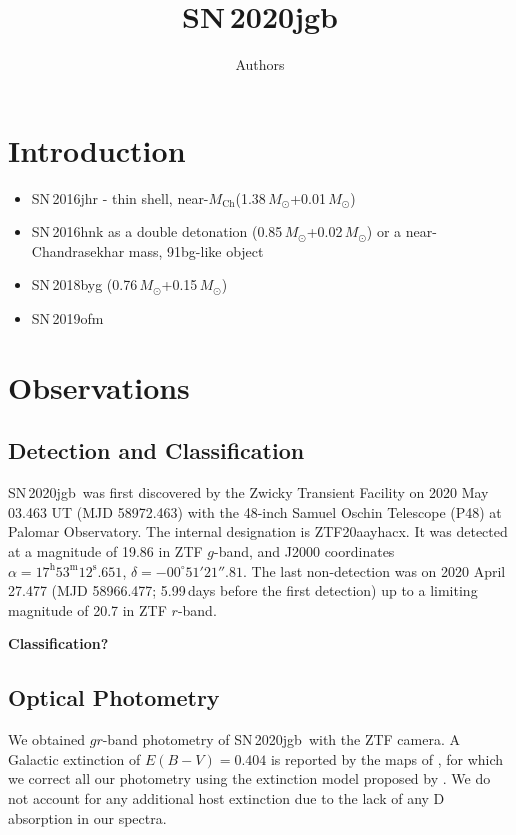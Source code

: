 \documentclass[twocolumn]{aastex631}
\newcommand\sn{SN\,2020jgb}
\newcommand{\Mch}{$M_\mathrm{Ch}$}
\begin{document}
\title{\sn}

\author{Authors}

\begin{abstract}

\end{abstract}


\section{Introduction} \label{sec:intro}
\begin{itemize}
    \item SN\,2016jhr \citep{jiang_16jhr_2017} - thin shell, near-\Mch (1.38\,$M_\odot$+0.01\,$M_\odot$)
    \item SN\,2016hnk as a double detonation \citep{jacobson-galan_16hnk_2020} (0.85\,$M_\odot$+0.02\,$M_\odot$) or a near-Chandrasekhar mass, 91bg-like object \citep{galbany_16hnk_2019}
    \item SN\,2018byg (0.76\,$M_\odot$+0.15\,$M_\odot$) \citep{de_18byg_2019}
    \item SN\,2019ofm \citep{de_Ca_rich_2020}
\end{itemize}
\section{Observations} \label{sec:obs}
\subsection{Detection and Classification}
\sn\ was first discovered by the Zwicky Transient Facility \citep[ZTF;][]{ZTF2019a,ZTF2019b} on 2020 May 03.463 UT (MJD 58972.463) with the 48-inch Samuel Oschin Telescope (P48) at Palomar Observatory. The internal designation is ZTF20aayhacx. It was detected at a magnitude of 19.86 in ZTF $g$-band, and J2000 coordinates $\alpha=17^\mathrm{h}53^\mathrm{m}12^\mathrm{s}.651$, $\delta=-00^\circ51'21''.81$. The last non-detection was on 2020 April 27.477 (MJD 58966.477; 5.99\,days before the first detection) up to a limiting magnitude of 20.7 in ZTF $r$-band.

\textbf{Classification?}

\subsection{Optical Photometry}
We obtained $gr$-band photometry of \sn\ with the ZTF camera. A Galactic extinction of $E(B-V)=0.404$ is reported by the maps of \citet{Schlafly2011}, for which we correct all our photometry using the extinction model proposed by \citet{Fitzpatrick1999}. We do not account for any additional host extinction due to the lack of any  D absorption in our spectra.
\end{document}
